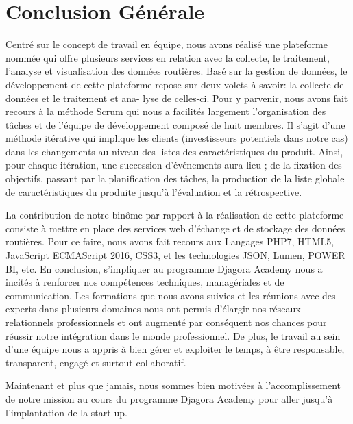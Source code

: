 \chapter*{Conclusion Générale}

Centré sur le concept de travail en équipe, nous avons réalisé une plateforme nommée
 qui offre plusieurs services en relation avec la collecte, le traitement, l’analyse
et visualisation des données routières. Basé sur la gestion de données, le développement de cette
plateforme repose sur deux volets à savoir: la collecte de données et le traitement et ana-
lyse de celles-ci. Pour y parvenir, nous avons fait recours à la méthode Scrum qui nous a
facilités largement l’organisation des tâches et de l’équipe de développement composé de
huit membres. Il s’agit d’une méthode itérative qui implique les clients (investisseurs
potentiels dans notre cas) dans les changements au niveau des listes des caractéristiques du
produit. Ainsi, pour chaque itération, une succession d’événements aura lieu ; de la fixation
des objectifs, passant par la planification des tâches, la production de la liste globale
de caractéristiques du produite jusqu'à l’évaluation et la rétrospective.

La contribution de
notre binôme par rapport à la réalisation de cette plateforme consiste à mettre en place
des services web d'échange et de stockage des données routières. Pour ce faire, nous avons fait
recours aux Langages PHP7, HTML5, JavaScript ECMAScript 2016, CSS3, et les technologies JSON, Lumen, POWER BI, etc. En conclusion,
s’impliquer au programme Djagora Academy nous a incités à renforcer nos compétences
techniques, managériales et de communication. Les formations que nous avons suivies et les
réunions avec des experts dans plusieurs domaines nous ont permis d’élargir nos réseaux
relationnels professionnels et ont augmenté par conséquent nos chances pour réussir notre
intégration dans le monde professionnel. De plus, le travail au sein d’une équipe nous a
appris à bien gérer et exploiter le temps, à être responsable, transparent, engagé et surtout
collaboratif.

Maintenant et plus que jamais, nous sommes bien motivées à l’accomplissement de
notre mission au cours du programme Djagora Academy pour aller jusqu'à l’implantation
de la start-up.

